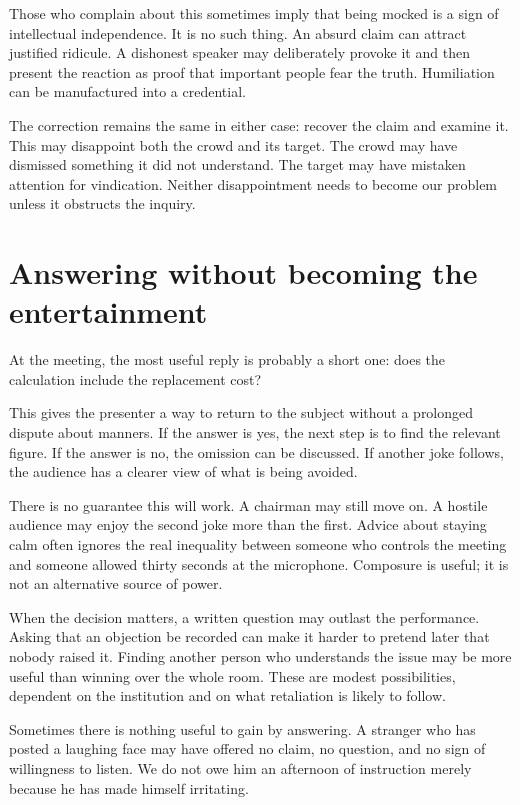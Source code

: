 \documentclass[12pt,a4paper]{book}
\begin{document}
Those who complain about this sometimes imply that being mocked is a sign of intellectual independence. It is no such thing. An absurd claim can attract justified ridicule. A dishonest speaker may deliberately provoke it and then present the reaction as proof that important people fear the truth. Humiliation can be manufactured into a credential.

The correction remains the same in either case: recover the claim and examine it. This may disappoint both the crowd and its target. The crowd may have dismissed something it did not understand. The target may have mistaken attention for vindication. Neither disappointment needs to become our problem unless it obstructs the inquiry.

\section*{Answering without becoming the entertainment}

At the meeting, the most useful reply is probably a short one: does the calculation include the replacement cost?

This gives the presenter a way to return to the subject without a prolonged dispute about manners. If the answer is yes, the next step is to find the relevant figure. If the answer is no, the omission can be discussed. If another joke follows, the audience has a clearer view of what is being avoided.

There is no guarantee this will work. A chairman may still move on. A hostile audience may enjoy the second joke more than the first. Advice about staying calm often ignores the real inequality between someone who controls the meeting and someone allowed thirty seconds at the microphone. Composure is useful; it is not an alternative source of power.

When the decision matters, a written question may outlast the performance. Asking that an objection be recorded can make it harder to pretend later that nobody raised it. Finding another person who understands the issue may be more useful than winning over the whole room. These are modest possibilities, dependent on the institution and on what retaliation is likely to follow.

Sometimes there is nothing useful to gain by answering. A stranger who has posted a laughing face may have offered no claim, no question, and no sign of willingness to listen. We do not owe him an afternoon of instruction merely because he has made himself irritating.
\end{document}
